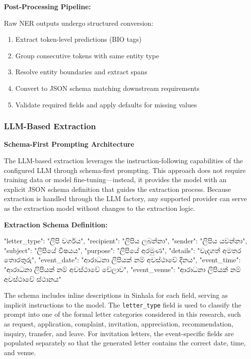 \documentclass[12pt]{uomthesis}
\begin{document}
\textbf{Post-Processing Pipeline:}

Raw NER outputs undergo structured conversion:
\begin{enumerate}
    \item Extract token-level predictions (BIO tags)
    \item Group consecutive tokens with same entity type
    \item Resolve entity boundaries and extract spans
    \item Convert to JSON schema matching downstream requirements
    \item Validate required fields and apply defaults for missing values
\end{enumerate}

\subsubsection{LLM-Based Extraction}

\textbf{Schema-First Prompting Architecture}

The LLM-based extraction leverages the instruction-following capabilities of the configured LLM through schema-first prompting. This approach does not require training data or model fine-tuning—instead, it provides the model with an explicit JSON schema definition that guides the extraction process. Because extraction is handled through the LLM factory, any supported provider can serve as the extraction model without changes to the extraction logic.

\textbf{Extraction Schema Definition:}

\begin{SinhalaVerbatim}
{
    "letter_type": "ලිපි වර්ගය",
    "recipient": "ලිපිය ලබන්නා",
    "sender": "ලිපිය යවන්නා",
    "subject": "ලිපියේ විෂයය",
    "purpose": "ලිපියේ අරමුණ",
    "details": "වැදගත් අමතර තොරතුරු",
    "event_date": "ආරාධනා ලිපියක් නම් අවස්ථාවේ දිනය",
    "event_time": "ආරාධනා ලිපියක් නම් අවස්ථාවේ වේලාව",
    "event_venue": "ආරාධනා ලිපියක් නම් අවස්ථාවේ ස්ථානය"
}
\end{SinhalaVerbatim}

The schema includes inline descriptions in Sinhala for each field, serving as implicit instructions to the model. The \texttt{letter\_type} field is used to classify the prompt into one of the formal letter categories considered in this research, such as request, application, complaint, invitation, appreciation, recommendation, inquiry, transfer, and leave. For invitation letters, the event-specific fields are populated separately so that the generated letter contains the correct date, time, and venue.
\end{document}
